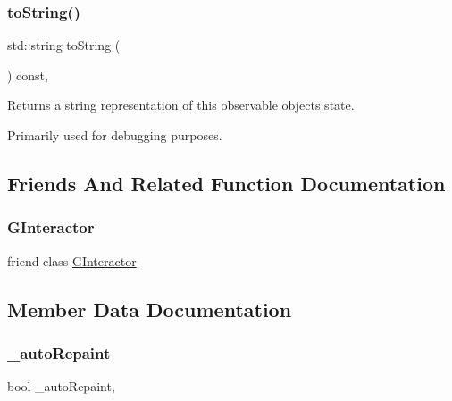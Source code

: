 \subsubsection{\texorpdfstring{to\+String()}{toString()}}
{\footnotesize\ttfamily std\+::string to\+String (\begin{DoxyParamCaption}{ }\end{DoxyParamCaption}) const\hspace{0.3cm}{\ttfamily [virtual]}, {\ttfamily [inherited]}}



Returns a string representation of this observable object\textquotesingle{}s state. 

Primarily used for debugging purposes. 

\subsection{Friends And Related Function Documentation}
\mbox{\label{classsgl_1_1GWindow_a054e99eaa992da5c1a77c8d7b3817788}} 
\subsubsection{\texorpdfstring{G\+Interactor}{GInteractor}}
{\footnotesize\ttfamily friend class \mbox{\hyperlink{classsgl_1_1GInteractor}{G\+Interactor}}\hspace{0.3cm}{\ttfamily [friend]}}



\subsection{Member Data Documentation}
\mbox{\label{classsgl_1_1GDrawingSurface_a738dd6afc69ac536ad46cf4d89a90933}} 
\subsubsection{\texorpdfstring{\+\_\+auto\+Repaint}{\_autoRepaint}}
{\footnotesize\ttfamily bool \+\_\+auto\+Repaint\hspace{0.3cm}{\ttfamily [protected]}, {\ttfamily [inherited]}}

